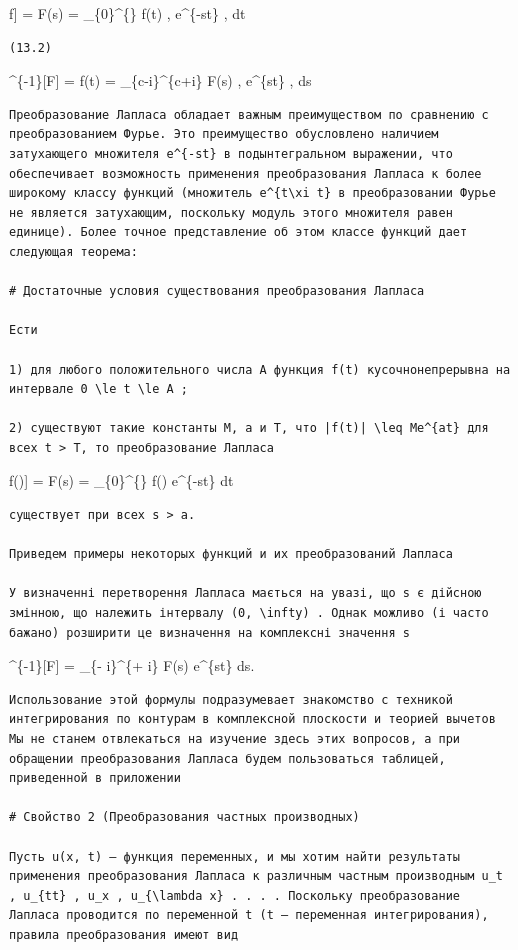 \documentclass[
  ukrainian,
]{article}
\begin{document}
\mathscr{L}{[}f{]} = F(s) = \int\_\{0\}\^{}\{\infty\} f(t) ,
e\^{}\{-st\} , dt \quad {}

\begin{verbatim}
(13.2)
\end{verbatim}

\^{}\{-1\}{[}F{]} = f(t) = 
\int\_\{c-i\infty\}\^{}\{c+i\infty\} F(s) , e\^{}\{st\} , ds
\quad {}

\begin{verbatim}
Преобразование Лапласа обладает важным преимуществом по сравнению с преобразованием Фурье. Это преимущество обусловлено наличием затухающего множителя e^{-st} в подынтегральном выражении, что обеспечивает возможность применения преобразования Лапласа к более широкому классу функций (множитель e^{t\xi t} в преобразовании Фурье не является затухающим, поскольку модуль этого множителя равен единице). Более точное представление об этом классе функций дает следующая теорема:

# Достаточные условия существования преобразования Лапласа

Ести

1) для любого положительного числа A функция f(t) кусочнонепрерывна на интервале 0 \le t \le A ;

2) существуют такие константы M, a и T, что |f(t)| \leq Me^{at} для всех t > T, то преобразование Лапласа
\end{verbatim}

\mathscr{L}{[}f(\ell){]} = F(s) = \int\_\{0\}\^{}\{\infty\} f(\ell)
e\^{}\{-st\} dt

\begin{verbatim}
существует при всех s > a.

Приведем примеры некоторых функций и их преобразований Лапласа

У визначенні перетворення Лапласа мається на увазі, що s є дійсною змінною, що належить інтервалу (0, \infty) . Однак можливо (і часто бажано) розширити це визначення на комплексні значення s
\end{verbatim}

\^{}\{-1\}{[}F{]} =  \int\_\{\epsilon -
i\infty\}\^{}\{\epsilon + i\infty\} F(s) e\^{}\{st\} ds.

\begin{verbatim}
Использование этой формулы подразумевает знакомство с техникой интегрирования по контурам в комплексной плоскости и теорией вычетов Мы не станем отвлекаться на изучение здесь этих вопросов, а при обращении преобразования Лапласа будем пользоваться таблицей, приведенной в приложении

# Свойство 2 (Преобразования частных производных)

Пусть u(x, t) — функция переменных, и мы хотим найти результаты применения преобразования Лапласа к различным частным производным u_t , u_{tt} , u_x , u_{\lambda x} . . . . Поскольку преобразование Лапласа проводится по переменной t (t — переменная интегрирования), правила преобразования имеют вид
\end{verbatim}
\end{document}
